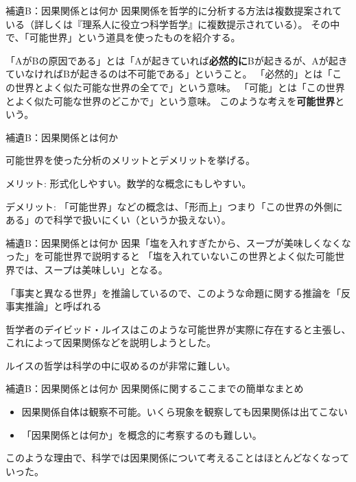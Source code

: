 \documentclass[12pt, unicode]{beamer}
\begin{document}
\begin{frame}{補遺B：因果関係とは何か}
因果関係を哲学的に分析する方法は複数提案されている（詳しくは『理系人に役立つ科学哲学』に複数提示されている）。
その中で、「可能世界」という道具を使ったものを紹介する。

「AがBの原因である」とは「Aが起きていれば\textbf{必然的に}Bが起きるが、Aが起きていなければBが起きるのは不可能である」ということ。
「必然的」とは「この世界とよく似た可能な世界の全てで」という意味。
「可能」とは「この世界とよく似た可能な世界のどこかで」という意味。
このような考えを\textbf{可能世界}という。

\end{frame}
\begin{frame}{補遺B：因果関係とは何か}

可能世界を使った分析のメリットとデメリットを挙げる。

メリット: 形式化しやすい。数学的な概念にもしやすい。

デメリット: 「可能世界」などの概念は、「形而上」つまり「この世界の外側にある」ので科学で扱いにくい（というか扱えない）。

\end{frame}

\begin{frame}{補遺B：因果関係とは何か}
因果「塩を入れすぎたから、スープが美味しくなくなった」を可能世界で説明すると
「塩を入れていないこの世界とよく似た可能世界では、スープは美味しい」となる。

「事実と異なる世界」を推論しているので、このような命題に関する推論を「反事実推論」と呼ばれる

哲学者のデイビッド・ルイスはこのような可能世界が実際に存在すると主張し、
これによって因果関係などを説明しようとした。

ルイスの哲学は科学の中に収めるのが非常に難しい。

\end{frame}

\begin{frame}{補遺B：因果関係とは何か}
因果関係に関するここまでの簡単なまとめ
\begin{itemize}
\item 因果関係自体は観察不可能。いくら現象を観察しても因果関係は出てこない
\item 「因果関係とは何か」を概念的に考察するのも難しい。
\end{itemize}

このような理由で、科学では因果関係について考えることはほとんどなくなっていった。

\end{frame}
\end{document}
